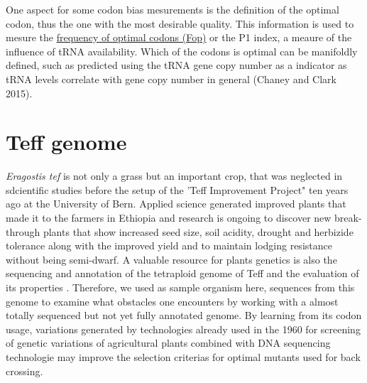 One aspect for some codon bias mesurements is the definition of the optimal codon, thus the one with the most desirable quality. This information is used to mesure the \hyperlink{function:Fop}{frequency of optimal codons (Fop)} or the P1 index, a meaure of the influence of tRNA availability. Which of the codons is optimal can be manifoldly defined, such as predicted using the tRNA gene copy number as a indicator as tRNA levels correlate with gene copy number in general \cite{Chaney2015}(Chaney and Clark 2015).

\section{Teff genome}
\textit{Eragostis tef} is not only a grass but an important crop, that was neglected in sdcientific studies before the setup of the 'Teff Improvement Project" ten years ago at the University of Bern. Applied science generated improved plants that made it to the farmers in Ethiopia and research is ongoing to discover new break-through plants that show increased seed size, soil acidity, drought and herbizide tolerance along with the improved yield and to maintain lodging resistance without being semi-dwarf. A valuable resource for plants genetics is also the sequencing and annotation of the tetraploid genome of Teff and the evaluation of its properties \cite{cannarozzi2014genome}. Therefore, we used as sample organism here, sequences from this genome to examine what obstacles one encounters by working with a almost totally sequenced but not yet fully annotated genome. By learning from its codon usage, variations generated by technologies already used in the 1960 for screening of genetic variations of agricultural plants combined with DNA sequencing technologie may improve the selection criterias for optimal mutants used for back crossing. 



